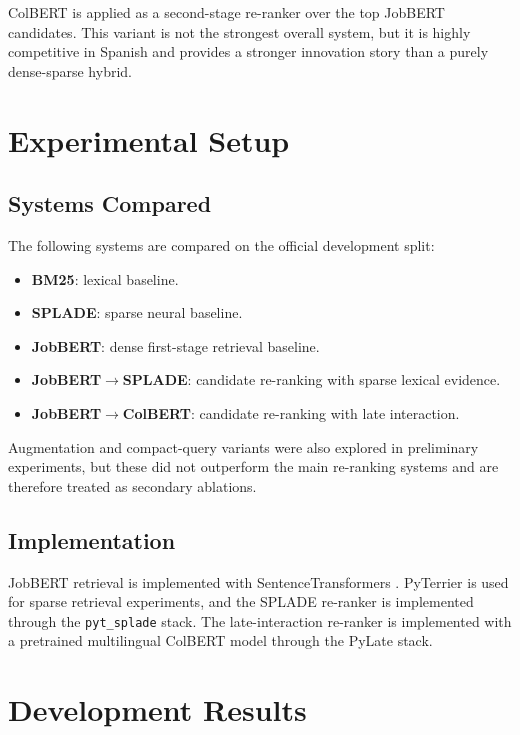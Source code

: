 \documentclass[
]{ceurart}
\begin{document}
ColBERT is applied as a second-stage re-ranker over the top JobBERT candidates. This
variant is not the strongest overall system, but it is highly competitive in Spanish
and provides a stronger innovation story than a purely dense-sparse hybrid.

\section{Experimental Setup}

\subsection{Systems Compared}

The following systems are compared on the official development split:

\begin{itemize}
  \item \textbf{BM25}: lexical baseline.
  \item \textbf{SPLADE}: sparse neural baseline.
  \item \textbf{JobBERT}: dense first-stage retrieval baseline.
  \item \textbf{JobBERT\texorpdfstring{$\rightarrow$}{->}SPLADE}: candidate re-ranking with sparse lexical evidence.
  \item \textbf{JobBERT\texorpdfstring{$\rightarrow$}{->}ColBERT}: candidate re-ranking with late interaction.
\end{itemize}

Augmentation and compact-query variants were also explored in preliminary experiments,
but these did not outperform the main re-ranking systems and are therefore treated as
secondary ablations.

\subsection{Implementation}

JobBERT retrieval is implemented with SentenceTransformers \cite{reimers2019sentencebert}.
PyTerrier is used for sparse retrieval experiments, and the SPLADE re-ranker is
implemented through the \texttt{pyt\_splade} stack. The late-interaction re-ranker is
implemented with a pretrained multilingual ColBERT model through the PyLate stack.

\section{Development Results}
\end{document}
